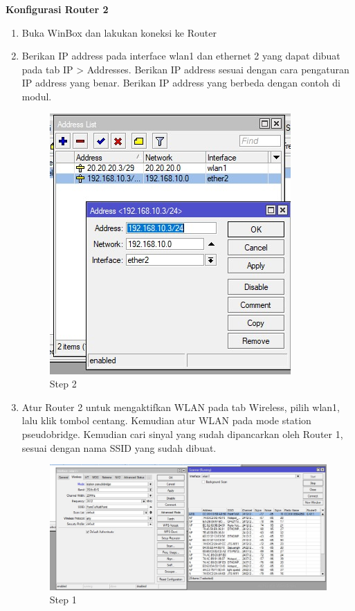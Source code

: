 \begin{enumerate}
\end{enumerate}


\begin{center} 
	\textbf{Konfigurasi Router 2}
\end{center}

\begin{enumerate}
	\item Buka WinBox dan lakukan koneksi ke Router

	\item Berikan IP address pada interface wlan1 dan ethernet 2 yang dapat dibuat pada tab IP > Addresses. Berikan IP address sesuai dengan cara pengaturan IP address yang benar. Berikan IP
	address yang berbeda dengan contoh di modul.
	\begin{figure}[H]
		\centering
		\includegraphics[width=0.5\linewidth]{P1/img/per3pc2step2.jpg}
		\caption{Step 2}
		\label{fig:gambar23}
	\end{figure}

	\item Atur Router 2 untuk mengaktifkan WLAN pada tab Wireless, pilih wlan1, lalu klik tombol centang. Kemudian atur WLAN pada mode station pseudobridge. Kemudian cari sinyal yang sudah
	dipancarkan oleh Router 1, sesuai dengan nama SSID yang sudah dibuat.
	\begin{figure}[H]
		\centering
		\includegraphics[width=0.5\linewidth]{P1/img/per3pc2step3.jpg}
		\caption{Step 1}
		\label{fig:gambar24}
	\end{figure}


\end{enumerate}

